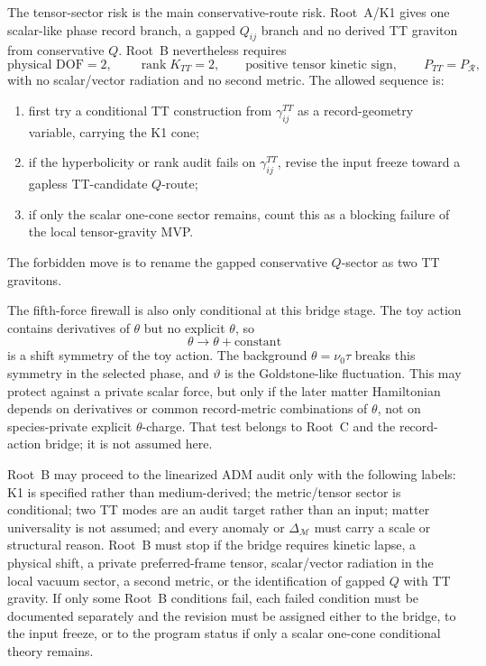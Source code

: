 \documentclass[11pt]{article}
\begin{document}
The tensor-sector risk is the main conservative-route risk.  Root~A/K1 gives
one scalar-like phase record branch, a gapped \(Q_{ij}\) branch and no derived
TT graviton from conservative \(Q\).  Root~B nevertheless requires
\[
\boxed{
\text{physical DOF}=2,\qquad \operatorname{rank}K_{TT}=2,\qquad
\text{positive tensor kinetic sign},\qquad
P_{TT}=P_{\mathcal R},
}
\]
with no scalar/vector radiation and no second metric.  The allowed sequence is:
\begin{enumerate}
\item first try a conditional TT construction from \(\gamma_{ij}^{TT}\) as a
  record-geometry variable, carrying the K1 cone;
\item if the hyperbolicity or rank audit fails on \(\gamma_{ij}^{TT}\), revise
  the input freeze toward a gapless TT-candidate \(Q\)-route;
\item if only the scalar one-cone sector remains, count this as a blocking
  failure of the local tensor-gravity MVP.
\end{enumerate}
The forbidden move is to rename the gapped conservative \(Q\)-sector as two TT
gravitons.

The fifth-force firewall is also only conditional at this bridge stage.  The
toy action contains derivatives of \(\theta\) but no explicit \(\theta\), so
\[
\boxed{\theta\to\theta+\text{constant}}
\]
is a shift symmetry of the toy action.  The background
\(\theta=\nu_0\tau\) breaks this symmetry in the selected phase, and
\(\vartheta\) is the Goldstone-like fluctuation.  This may protect against a
private scalar force, but only if the later matter Hamiltonian depends on
derivatives or common record-metric combinations of \(\theta\), not on
species-private explicit \(\theta\)-charge.  That test belongs to Root~C and
the record-action bridge; it is not assumed here.

Root~B may proceed to the linearized ADM audit only with the following labels:
K1 is specified rather than medium-derived; the metric/tensor sector is
conditional; two TT modes are an audit target rather than an input; matter
universality is not assumed; and every anomaly or \(\Delta_{\mathcal M}\)
must carry a scale or structural reason.  Root~B must stop if the bridge
requires kinetic lapse, a physical shift, a private preferred-frame tensor,
scalar/vector radiation in the local vacuum sector, a second metric, or the
identification of gapped \(Q\) with TT gravity.  If only some Root~B conditions
fail, each failed condition must be documented separately and the revision
must be assigned either to the bridge, to the input freeze, or to the program
status if only a scalar one-cone conditional theory remains.
\end{document}
